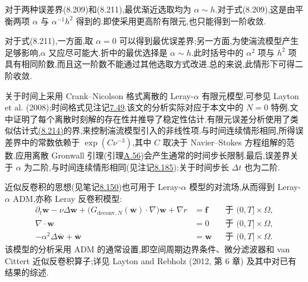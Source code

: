 \begin{note}
\label{note:leray-alpha-optimal-alpha-choice}
对于两种误差界(8.209)和(8.211),最优渐近选取均为 $\alpha\sim h$.对于式(8.209),这是由平衡两项 $\alpha$ 与 $\alpha^{-1}h^2$ 得到的.即使采用更高阶有限元,也只能得到一阶收敛.

对于式(8.211),一方面,取 $\alpha=0$ 可以得到最优误差界;另一方面,为使湍流模型产生足够影响,$\alpha$ 又应尽可能大.折中的最优选择是 $\alpha\sim h$.此时括号中的 $\alpha^2$ 项与 $h^2$ 项具有相同阶数,而且这一阶数不能通过其他选取方式改进.总的来说,此情形下可得二阶收敛.
\end{note}

\begin{note}[全离散情形]
\label{note:leray-alpha-fully-discrete}
关于时间上采用 Crank--Nicolson 格式离散的 Leray-$\alpha$ 有限元模型,可参见 Layton et al. (2008);时间格式见注记\hyperref[ex:time-dependent-crank-nicolson]{7.49}.该文的分析实际对应于本文中的 $N=0$ 特例.文中证明了每个离散时刻解的存在性并推导了稳定性估计.有限元误差分析使用了类似估计式\hyperref[eq:leray-alpha-fem-error-strong-convection-bound]{(8.214)}的界,来控制湍流模型引入的非线性项.与时间连续情形相同,所得误差界中的常数依赖于 $\exp(C\nu^{-3})$,其中 $C$ 取决于 Navier--Stokes 方程组解的范数.应用离散 Gronwall 引理(引理\hyperref[lem:appendix-a-56]{A.56})会产生通常的时间步长限制.最后,误差界关于 $\alpha$ 为二阶,与时间连续情形相同(见注记\hyperref[note:leray-alpha-optimal-alpha-choice]{8.185});关于时间步长 $\Delta t$ 也为二阶.
\end{note}

\begin{note}
\label{note:leray-alpha-approximate-deconvolution}
近似反卷积的思想(见笔记\hyperref[note:les-adm-basic-idea]{8.150})也可用于 Leray-$\alpha$ 模型的对流场,从而得到 Leray-$\alpha$ ADM,亦称 Leray 反卷积模型:
\[
\begin{aligned}
 \partial_t\bm{w}-\nu\Delta\bm{w}
  +\bigl(G_{\mathrm{deconv},N}(\overline{\bm{w}})
      \cdot\nabla\bigr)\bm{w}+\nabla r
  &=\bm{f} &&\text{于 }(0,T]\times\Omega,\\
 \nabla\cdot\bm{w}&=0 &&\text{于 }(0,T]\times\Omega,\\
 -\alpha^2\Delta\overline{\bm{w}}+\overline{\bm{w}}
  &=\bm{w} &&\text{于 }(0,T]\times\Omega.
\end{aligned}
\]
该模型的分析采用 ADM 的通常设置,即空间周期边界条件、微分滤波器和 van Cittert 近似反卷积算子;详见 Layton and Rebholz (2012, 第 6 章) 及其中对已有结果的综述.
\end{note}

